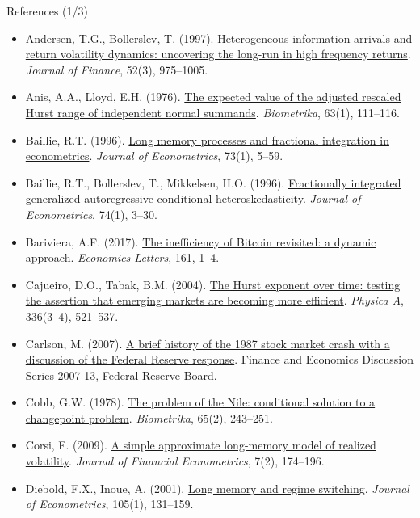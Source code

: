 \begin{frame}{References (1/3)}
\itemsize{\tiny}
\begin{itemize}
    \item Andersen, T.G., Bollerslev, T. (1997). \href{https://doi.org/10.1111/j.1540-6261.1997.tb02722.x}{Heterogeneous information arrivals and return volatility dynamics: uncovering the long-run in high frequency returns}. \textit{Journal of Finance}, 52(3), 975--1005.
    \item Anis, A.A., Lloyd, E.H. (1976). \href{https://doi.org/10.1093/biomet/63.1.111}{The expected value of the adjusted rescaled Hurst range of independent normal summands}. \textit{Biometrika}, 63(1), 111--116.
    \item Baillie, R.T. (1996). \href{https://doi.org/10.1016/0304-4076(95)01732-1}{Long memory processes and fractional integration in econometrics}. \textit{Journal of Econometrics}, 73(1), 5--59.
    \item Baillie, R.T., Bollerslev, T., Mikkelsen, H.O. (1996). \href{https://doi.org/10.1016/S0304-4076(95)01749-6}{Fractionally integrated generalized autoregressive conditional heteroskedasticity}. \textit{Journal of Econometrics}, 74(1), 3--30.
    \item Bariviera, A.F. (2017). \href{https://doi.org/10.1016/j.econlet.2017.09.013}{The inefficiency of Bitcoin revisited: a dynamic approach}. \textit{Economics Letters}, 161, 1--4.
    \item Cajueiro, D.O., Tabak, B.M. (2004). \href{https://doi.org/10.1016/j.physa.2003.12.031}{The Hurst exponent over time: testing the assertion that emerging markets are becoming more efficient}. \textit{Physica A}, 336(3--4), 521--537.
    \item Carlson, M. (2007). \href{https://www.federalreserve.gov/pubs/feds/2007/200713/index.html}{A brief history of the 1987 stock market crash with a discussion of the Federal Reserve response}. Finance and Economics Discussion Series 2007-13, Federal Reserve Board.
    \item Cobb, G.W. (1978). \href{https://doi.org/10.1093/biomet/65.2.243}{The problem of the Nile: conditional solution to a changepoint problem}. \textit{Biometrika}, 65(2), 243--251.
    \item Corsi, F. (2009). \href{https://doi.org/10.1093/jjfinec/nbp001}{A simple approximate long-memory model of realized volatility}. \textit{Journal of Financial Econometrics}, 7(2), 174--196.
    \item Diebold, F.X., Inoue, A. (2001). \href{https://doi.org/10.1016/S0304-4076(01)00073-2}{Long memory and regime switching}. \textit{Journal of Econometrics}, 105(1), 131--159.

\end{itemize}
\end{frame}
